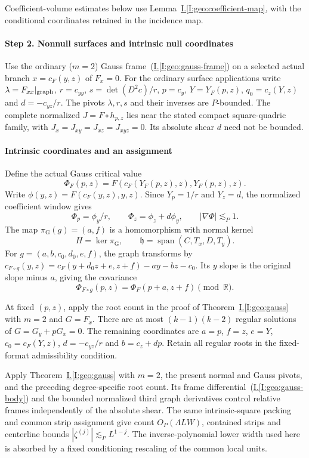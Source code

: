 \documentclass[11pt]{amsart}
\theoremstyle{definition}
\theoremstyle{remark}
\newcommand{\R}{\mathbb R}
\numberwithin{equation}{section}
\newcommand{\partIref}[1]{\hyperref[I:#1]{I.\ref*{I:#1}}}
\newcommand{\partIeqref}[1]{\textup{(\partIref{#1})}}
\begin{document}
Coefficient-volume estimates below use Lemma~\partIref{geo:coefficient-map}, with the conditional coordinates retained in the incidence map.

\paragraph{Step 2. Nonnull surfaces and intrinsic null coordinates}
Use the ordinary ($m=2$) Gauss frame~\partIeqref{geo:gauss-frame} on a selected actual branch $x=c_F(y,z)$ of $F_x=0$. For the ordinary surface applications write $\lambda=F_{xx}|_{\rm graph}$, $r=c_{yy}$, $s=\det(D^2c)/r$, $p=c_y$, $Y=Y_F(p,z)$, $q_0=c_z(Y,z)$ and $d=-c_{yz}/r$. The pivots $\lambda,r,s$ and their inverses are $P$-bounded. The complete normalized $J=F\circ h_{p,z}$ lies near the stated compact square-quadric family, with $J_x=J_{xy}=J_{xz}=J_{xyz}=0$. Its absolute shear $d$ need not be bounded.

\paragraph{Intrinsic coordinates and an assignment}
Define the actual Gauss critical value
\[
\Phi_F(p,z)=F(c_F(Y_F(p,z),z),Y_F(p,z),z).
\]
Write $\phi(y,z)=F(c_F(y,z),y,z)$. Since $Y_p=1/r$ and $Y_z=d$, the normalized coefficient window gives
\[
\Phi_p=\phi_y/r,\qquad \Phi_z=\phi_z+d\phi_y,
\qquad |\nabla\Phi|\lesssim_P1.
\]
The map $\pi_{\mathrm G}(g)=(a,f)$ is a homomorphism with normal kernel
\[
H=\ker\pi_{\mathrm G},\qquad \mathfrak h=\operatorname{span}(C,T_x,D,T_y).
\]
For $g=(a,b,c_0,d_0,e,f)$, the graph transforms by $c_{F\circ g}(y,z)=c_F(y+d_0z+e,z+f)-ay-bz-c_0$. Its $y$ slope is the original slope minus $a$, giving the covariance
\begin{equation}\label{low:4:sf:eq:gausscov}
\Phi_{F\circ g}(p,z)=\Phi_F(p+a,z+f)\pmod{\R}.
\end{equation}

At fixed $(p,z)$, apply the root count in the proof of Theorem~\partIref{geo:gauss} with $m=2$ and $G=F_x$. There are at most $(k-1)(k-2)$ regular solutions of $G=G_y+pG_x=0$. The remaining coordinates are $a=p$, $f=z$, $e=Y$, $c_0=c_F(Y,z)$, $d=-c_{yz}/r$ and $b=c_z+dp$. Retain all regular roots in the fixed-format admissibility condition.

Apply Theorem~\partIref{geo:gauss} with $m=2$, the present normal and Gauss pivots, and the preceding degree-specific root count. Its frame differential~\partIeqref{geo:gauss-body} and the bounded normalized third graph derivatives control relative frames independently of the absolute shear. The same intrinsic-square packing and common strip assignment give count $O_P(\Lambda LW)$, contained strips and centerline bounds $|\zeta^{(j)}|\lesssim_PL^{1-j}$. The inverse-polynomial lower width used here is absorbed by a fixed conditioning rescaling of the common local units.
\end{document}
